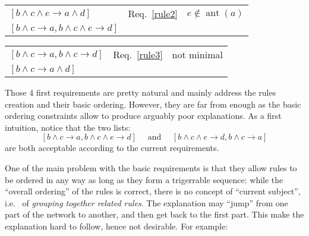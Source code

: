 \documentclass[a4paper]{article}
\newcommand{\cmark}{\ding{51}}
\newcommand{\xmark}{\ding{55}}
\newcommand*{\say}[1]{``{#1}''}
\newcommand*{\ie}{i.e.\ }
\newcommand*{\rar}{\rightarrow}                         %
\newcommand*{\conj}{\wedge}                             %
\DeclareMathOperator{\antecedents}{ant}
\begin{document}
\begin{center}
  \begin{minipage}{0.25\textwidth}
  \end{minipage}
  \begin{minipage}{0.74\textwidth}
    \begin{tabular}{lll}
      $ [ b\conj c\conj e \rar a \conj d] $           & \xmark{} Req.~\ref{rule2} & $e\notin \antecedents(a)$ \\
      $ [ b\conj c \rar a, b\conj c \conj e \rar d] $ & \cmark{}                  & \\
    \end{tabular}
  \end{minipage}

  \medskip

  \begin{minipage}{0.25\textwidth}
  \end{minipage}
  \begin{minipage}{0.74\textwidth}
    \begin{tabular}{lll}
      $ [ b\conj c \rar a, b\conj c \rar d] $ & \xmark{} Req.~\ref{rule3} & not minimal \\
      $ [ b\conj c \rar a \conj d] $          & \cmark{}                  & \\
    \end{tabular}
  \end{minipage}

\end{center}

Those 4 first requirements are pretty natural and mainly address the rules creation and their basic ordering.
However, they are far from enough as the basic ordering constraints allow to produce
arguably poor explanations.
As a first intuition, notice that the two lists:
\[ [ b\conj c \rar a, b\conj c \conj e \rar d] \quad \text{ and } \quad [ b\conj c \conj e \rar d, b\conj c \rar a] \]
are both acceptable according to the current requirements.

One of the main problem with the basic requirements is that they
allow rules to be ordered in any way as long as they form a trigerrable sequence:
while the \say{overall ordering} of the rules is correct, there is no concept of \say{current subject},
\ie{} of \emph{grouping together related rules}.
The explanation may \say{jump} from one part of the network to another, and then get back to the first part.
This make the explanation hard to follow, hence not desirable.
For example:
\end{document}

